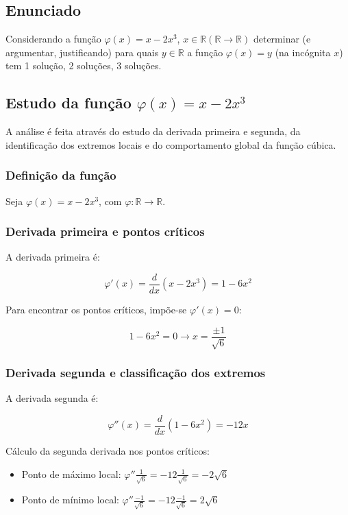\documentclass[../resumo.tex]{subfiles}
\begin{document}
	\subsection{Enunciado}

	Considerando a função $\varphi(x) = x - 2x^3$, $x \in \mathbb{R} (\mathbb{R} \rightarrow \mathbb{R})$
	determinar (e argumentar, justificando) para quais $y \in \mathbb{R}$ a função $\varphi(x) = y$ (na
	incógnita $x$) tem 1 solução, 2 soluções, 3 soluções.

	\subsection{Estudo da função $\varphi(x) = x - 2x^3$}
	
	A análise é feita através do estudo da derivada primeira e segunda, da identificação dos
	extremos locais e do comportamento global da função cúbica.

	\subsubsection{Definição da função}

	Seja $\varphi(x) = x - 2x^3$, com $\varphi: \mathbb{R} \rightarrow \mathbb{R}$.

	\subsubsection{Derivada primeira e pontos críticos}

	A derivada primeira é:

	\[ \varphi'(x) = \frac{d}{dx}(x - 2x^3) = 1 - 6x^2 \]
	
	Para encontrar os pontos críticos, impõe-se $\varphi'(x) = 0$:
	
	\[ 1 - 6x^2 = 0 \rightarrow x = \frac{\pm 1}{\sqrt{6}} \]

	\subsubsection{Derivada segunda e classificação dos extremos}

	A derivada segunda é:

	\[ \varphi''(x) = \frac{d}{dx}(1 - 6x^2) = -12x \]

	Cálculo da segunda derivada nos pontos críticos:

	\begin{itemize}
		\item Ponto de máximo local: $\varphi''\frac{1}{\sqrt{6}} = -12\frac{1}{\sqrt{6}} = -2\sqrt{6}$
		\item Ponto de mínimo local: $\varphi''\frac{-1}{\sqrt{6}} = -12\frac{-1}{\sqrt{6}} = 2\sqrt{6}$
	\end{itemize}
\end{document}
